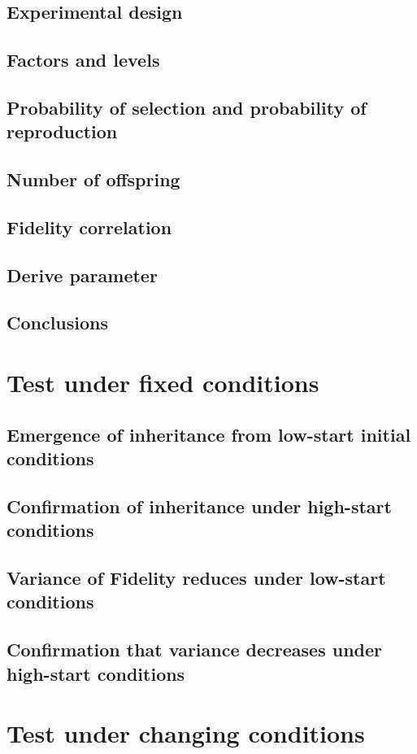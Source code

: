 \documentclass[]{report}
\begin{document}
\section{Experimental design}
\section{Factors and levels}
\section{Probability of selection and probability of reproduction}
\section{Number of offspring}
\section{Fidelity correlation}
\section{Derive parameter}
\section{Conclusions}

\chapter{Test under fixed conditions}
\section{Emergence of inheritance from low-start initial conditions}
\section{Confirmation of inheritance under high-start conditions}
\section{Variance of Fidelity reduces under low-start conditions}
\section{Confirmation that variance decreases under high-start conditions}

\chapter{Test under changing conditions}
\end{document}
